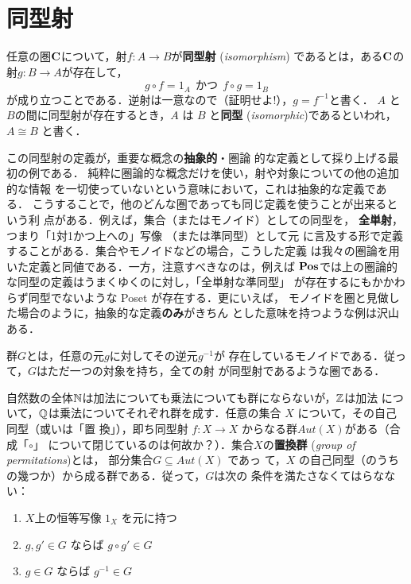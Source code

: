 \section{同型射}
\begin{definition}
 任意の圏${\bf C}$について，射$f: A \to B $が{\bfseries 同型射}
 ({\itshape isomorphism})
 であるとは，ある${\bf C}$の射$g: B \to A$が存在して，
 \[
  g \circ f = 1_A\ \ \text{かつ}\ \ f \circ g = 1_B
 \]
 が成り立つことである．逆射は一意なので（証明せよ!），$g = f^{-1}$と書く．
 $A$ と $B$の間に同型射が存在するとき，$A$ は $B$ と{\bfseries 同型}
 ({\itshape isomorphic})であるといわれ，$A \cong B$ と書く．
\end{definition}
この同型射の定義が，重要な概念の{\bfseries 抽象的}・圏論
的な定義として採り上げる最初の例である．
純粋に圏論的な概念だけを使い，射や対象についての他の追加的な情報
を一切使っていないという意味において，これは抽象的な定義である．
こうすることで，他のどんな圏であっても同じ定義を使うことが出来るという利
点がある．例えば，集合（またはモノイド）としての同型を，
{\bfseries 全単射}，つまり「1対1かつ上への」写像
（または準同型）として元
に言及する形で定義することがある．集合やモノイドなどの場合，こうした定義
は我々の圏論を用いた定義と同値である．一方，注意すべきなのは，例えば
$\mathbf{Pos}$では上の圏論的な同型の定義はうまくゆくのに対し，「全単射な準同型」
が存在するにもかかわらず同型でないような Poset が存在する．更にいえば，
モノイドを圏と見做した場合のように，抽象的な定義{\bfseries のみ}がきちん
とした意味を持つような例は沢山ある．

\begin{definition}
 群$G$とは，任意の元$g$に対してその逆元$g^{-1}$が
 存在しているモノイドである．従って，$G$はただ一つの対象を持ち，全ての射
 が同型射であるような圏である．
\end{definition}

自然数の全体$\mathbb{N}$は加法についても乗法についても群にならないが，$\mathbb{Z}$は加法
について，$\mathbb{Q}$は乗法についてそれぞれ群を成す．任意の集合
 $X$ について，その自己同型（或いは「置
 換」），即ち同型射 $f: X \to X$ からなる群$Aut(X)$がある（合成「$\circ$」
 について閉じているのは何故か？）．集合$X$の{\bfseries 置換群}
 ({\itshape group of permitations})とは，
 部分集合$G \subseteq Aut(X)$ であっ
 て，$X$ の自己同型（のうちの幾つか）から成る群である．従って，$G$は次の
 条件を満たさなくてはらなない：
\begin{enumerate}
 \item $X$上の恒等写像 $1_X$ を元に持つ
 \item $g, g' \in G$ ならば $g \circ g' \in G$
 \item $g \in G$ ならば $g^{-1} \in G$
\end{enumerate}

